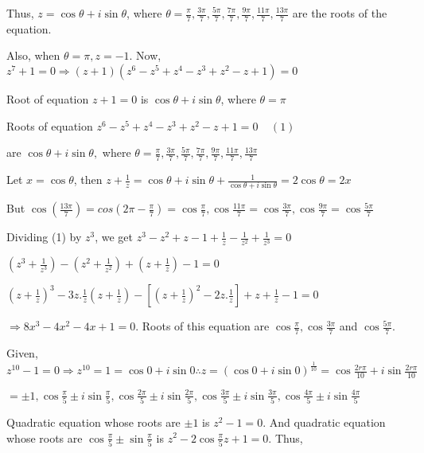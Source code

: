   Thus, $z = \cos\theta + i \sin\theta$, where $\theta = \frac{\pi}{7}, \frac{3\pi}{7}, \frac{5\pi}{7},
  \frac{7\pi}{7}, \frac{9\pi}{7}, \frac{11\pi}{7}, \frac{13\pi}{7}$ are the roots of the equation.

  Also, when $\theta = \pi, z = -1$. Now, $z^7 + 1 = 0 \Rightarrow (z + 1)(z^6 - z^5 + z^4 - z^3 + z^2 - z +
  1) = 0$

  Root of equation $z + 1 = 0$ is $\cos \theta + i \sin \theta$, where $\theta = \pi$

  Roots of equation $z^6 - z^5 + z^4 - z^3 + z^2 - z + 1 = 0\;\;\;\;(1)$

  are $\cos \theta + i \sin \theta,$ where $\theta = \frac{\pi}{7}, \frac{3\pi}{7}, \frac{5\pi}{7},
  \frac{7\pi}{7}, \frac{9\pi}{7}, \frac{11\pi}{7}, \frac{13\pi}{7}$

  Let $x = \cos \theta$, then $z + \frac{1}{z} = \cos \theta + i \sin \theta + \frac{1}{\cos \theta +
    i \sin \theta} = 2\cos\theta = 2x$

  But $\cos\left(\frac{13\pi}{7}\right) = cos\left(2\pi - \frac{\pi}{7}\right) = \cos\frac{\pi}{7},
  \cos\frac{11\pi}{7} = \cos\frac{3\pi}{7}, \cos\frac{9\pi}{7} = \cos\frac{5\pi}{7}$

  Dividing (1) by $z^3$, we get $z^3 - z^2 + z - 1 + \frac{1}{z} - \frac{1}{z^2} + \frac{1}{z^3} = 0$

  $\left(z^3 + \frac{1}{z^3}\right) - \left(z^2 + \frac{1}{z^2}\right) + \left(z + \frac{1}{z}\right) - 1 =
  0$

  $\left(z + \frac{1}{z}\right)^3 - 3z.\frac{1}{z}\left(z + \frac{1}{z}\right) - \left[\left(z +
    \frac{1}{z}\right)^2 - 2z.\frac{1}{z}\right] + z + \frac{1}{z} - 1 = 0$

  $\Rightarrow 8x^3 - 4x^2 -4x + 1 = 0$. Roots of this equation are $\cos \frac{\pi}{7}, \cos
  \frac{3\pi}{7}$ and $\cos \frac{5\pi}{7}$.
\item Given, $z^{10} - 1 = 0 \Rightarrow z^{10} = 1 = \cos 0 + i \sin 0\therefore z = (\cos 0 + i \sin
  0)^{\frac{1}{10}} = \cos\frac{2r\pi}{10} + i \sin\frac{2r\pi}{10}$

  $= \pm 1, \cos\frac{\pi}{5} \pm i\sin\frac{\pi}{5}, \cos\frac{2\pi}{5} \pm i\sin\frac{2\pi}{5},
  \cos\frac{3\pi}{5} \pm i\sin\frac{3\pi}{5}, \cos\frac{4\pi}{5} \pm i\sin\frac{4\pi}{5}$

  Quadratic equation whose roots are $\pm 1$ is $z^2 - 1 = 0$. And quadratic equation whose roots are
  $\cos\frac{\pi}{5} \pm \sin\frac{\pi}{5}$ is $z^2 - 2\cos\frac{\pi}{5}z + 1 = 0$. Thus,

